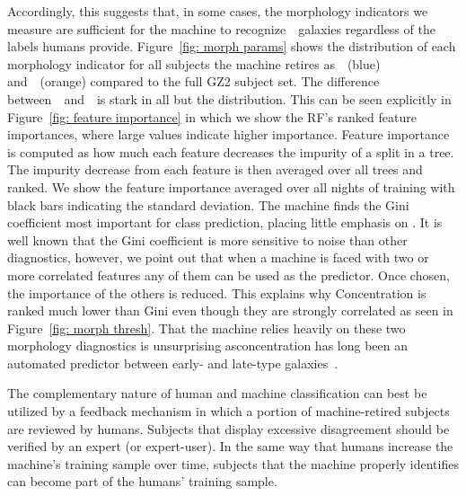 Accordingly, this suggests that, in some cases, the morphology indicators we measure are sufficient for the machine to recognize~\feat~galaxies regardless of the labels humans provide. Figure~\ref{fig: morph params} shows the distribution of each morphology indicator for all subjects the machine retires as~\feat~(blue) and~\notfeat~(orange) compared to the full GZ2 subject set. The difference between~\feat~and~\notfeat~is stark in all but the  distribution. This can be seen explicitly in Figure~\ref{fig:  feature importance} in which we show the RF's ranked feature importances, where large values indicate higher importance. Feature importance is computed as how much each feature decreases the impurity of a split in a tree. The impurity decrease from each feature is then averaged over all trees and ranked. We show the feature importance averaged over all nights of training with black bars indicating the standard deviation. The machine finds the Gini coefficient most important for class prediction, placing little emphasis on . It is well known that the Gini coefficient is more sensitive to noise than other diagnostics, however, we point out that when a machine is faced with two or more correlated features any of them can be used as the predictor. Once chosen, the importance of the others is reduced. This explains why Concentration is ranked much lower than Gini even though they are strongly correlated as seen in Figure~\ref{fig: morph thresh}. That the machine relies heavily on these two morphology diagnostics is unsurprising asconcentration has long been an automated predictor between early- and late-type galaxies~\citep{Abraham1994, Abraham1996, Shen2003}.


The complementary nature of human and machine classification can 
best be utilized by a feedback mechanism in which a portion of machine-retired
subjects are reviewed by humans. Subjects that display excessive disagreement
should be verified by an expert (or expert-user).  In the same way that 
humans increase the machine's training sample over time, subjects that the
machine properly identifies can become part of the humans' training sample. 



